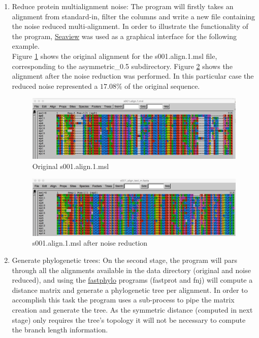 \documentclass[12pt]{article}
\begin{document}
\begin{enumerate}
	\item Reduce protein multialignment noise: 
The program will firstly takes an alignment from standard-in, filter the columns and write a new file containing the noise reduced multi-alignment. 
In order to illustrate the functionality of the program,   \href{http://doua.prabi.fr/software/seaview}{Seaview} was used as a graphical interface for the following example.\\

 Figure \ref{fig:al_1} shows the original alignment for the s001.align.1.msl file, corresponding to the asymmetric\_0.5 subdirectory. Figure \ref{fig:al_2} shows the alignment after the noise reduction was performed. In this particular case the reduced noise  represented a $17.08\%$ of the original sequence.

\begin{figure}[H]
	\includegraphics[width=\linewidth]{labnotes2.png}
	\caption{Original s001.align.1.msl}
	\label{fig:al_1}
\end{figure}

\begin{figure}[H]
	\includegraphics[width=\linewidth]{labnotes_1.png}
	\caption{s001.align.1.msl after noise reduction}
	\label{fig:al_2}
\end{figure}
	
	\item Generate phylogenetic trees:
 On the second stage, the program will pars through all the alignments available in the data directory (original and noise reduced), and using the  \href{http://fastphylo.sourceforge.net/}{fastphylo} programs (fastprot and fnj) will compute a distance matrix and generate a phylogenetic tree per alignment. In order to accomplish this task the program uses a sub-process to pipe the matrix creation and generate the tree. As the symmetric distance (computed in next stage) only requires the tree's topology it will not be necessary to compute the branch length information.  \\
 

\end{enumerate}
\end{document}
